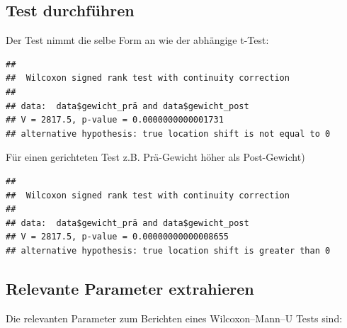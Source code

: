 \documentclass[
]{book}
\newenvironment{Shaded}{\begin{snugshade}}{\end{snugshade}}
\newcommand{\AttributeTok}[1]{\textcolor[rgb]{0.77,0.63,0.00}{#1}}
\newcommand{\FunctionTok}[1]{\textcolor[rgb]{0.00,0.00,0.00}{#1}}
\newcommand{\NormalTok}[1]{#1}
\newcommand{\SpecialCharTok}[1]{\textcolor[rgb]{0.00,0.00,0.00}{#1}}
\newcommand{\StringTok}[1]{\textcolor[rgb]{0.31,0.60,0.02}{#1}}
\begin{document}
\hypertarget{test-durchfuxfchren-4}{%
\subsection{Test durchführen}\label{test-durchfuxfchren-4}}

Der Test nimmt die selbe Form an wie der abhängige t-Test:

\begin{Shaded}
\end{Shaded}

\begin{verbatim}
## 
##  Wilcoxon signed rank test with continuity correction
## 
## data:  data$gewicht_prä and data$gewicht_post
## V = 2817.5, p-value = 0.0000000000001731
## alternative hypothesis: true location shift is not equal to 0
\end{verbatim}

Für einen gerichteten Test z.B. Prä-Gewicht höher als Post-Gewicht)

\begin{Shaded}
\end{Shaded}

\begin{verbatim}
## 
##  Wilcoxon signed rank test with continuity correction
## 
## data:  data$gewicht_prä and data$gewicht_post
## V = 2817.5, p-value = 0.00000000000008655
## alternative hypothesis: true location shift is greater than 0
\end{verbatim}

\hypertarget{relevante-parameter-extrahieren-3}{%
\subsection{Relevante Parameter extrahieren}\label{relevante-parameter-extrahieren-3}}

Die relevanten Parameter zum Berichten eines Wilcoxon--Mann--U Tests sind:
\end{document}
